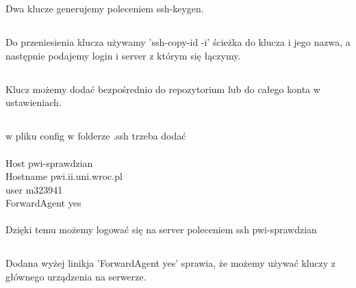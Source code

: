 \documentclass[a4paper]{article}
\begin{document}
\section{}
\subsection{}
Dwa klucze generujemy poleceniem ssh-keygen.
\subsection{}
Do przeniesienia klucza używamy 'ssh-copy-id -i' ścieżka do klucza i jego nazwa, a następnie podajemy login i server z którym się łączymy.
\subsection{}
Klucz możemy dodać bezpośrednio do repozytorium lub do całego konta w ustawieniach.
\subsection{}
w pliku config w folderze .ssh trzeba dodać\\ 
\\
Host pwi-sprawdzian\\
	Hostname pwi.ii.uni.wroc.pl\\
	user m323941\\
	ForwardAgent yes\\
	\\
Dzięki temu możemy logować się na server poleceniem
ssh pwi-sprawdzian
\subsection{}
Dodana wyżej linikja 'ForwardAgent yes' sprawia, że możemy używać kluczy z głównego urządzenia na serwerze.
\end{document}
